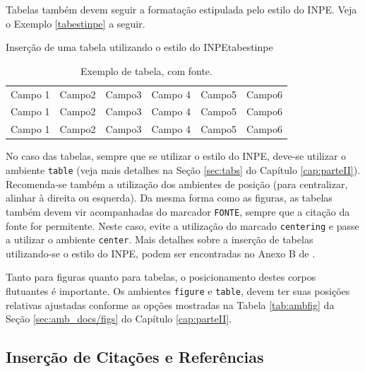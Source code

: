 Tabelas também devem seguir a formatação estipulada pelo estilo do INPE. Veja o Exemplo \ref{tabestinpe} a seguir.

\begin{texexptitled}[breakable,center lower,enhanced,middle=2mm,listing and text]{Inserção de uma tabela utilizando o estilo do INPE}{tabestinpe}
\begin{table}[H] %
\begin{center} %
\caption{Exemplo de tabela, com fonte.}
\begin{tabular}{l|l|c|c|r|r}
\hline %
Campo 1 & Campo2 & Campo3 & Campo 4 & Campo5 & Campo6 \\
Campo 1 & Campo2 & Campo3 & Campo 4 & Campo5 & Campo6 \\
Campo 1 & Campo2 & Campo3 & Campo 4 & Campo5 & Campo6 \\				
\hline %
\end{tabular}
\end{center}
\end{table}
\end{texexptitled}

No caso das tabelas, sempre que se utilizar o estilo do INPE, deve-se utilizar o ambiente {\tt table} (veja mais detalhes na Seção \ref{sec:tabs} do Capítulo \ref{cap:parteII}). Recomenda-se também a utilização dos ambientes de posição (para centralizar, alinhar à direita ou esquerda). Da mesma forma como as figuras, as tabelas também devem vir acompanhadas do marcador {\tt FONTE}, sempre que a citação da fonte for permitente. Neste caso, evite a utilização do marcado {\tt centering} e passe a utilizar o ambiente {\tt center}. Mais detalhes sobre a inserção de tabelas utilizando-se o estilo do INPE, podem ser encontradas no Anexo B de .

Tanto para figuras quanto para tabelas, o posicionamento destes corpos flutuantes é importante. Os ambientes {\tt figure} e {\tt table}, devem ter suas posições relativas ajustadas conforme as opções mostradas na Tabela \ref{tab:ambfig} da Seção \ref{sec:amb_docs/figs} do Capítulo \ref{cap:parteII}.

\subsection{Inserção de Citações e Referências}
\label{sec:citerefs}

